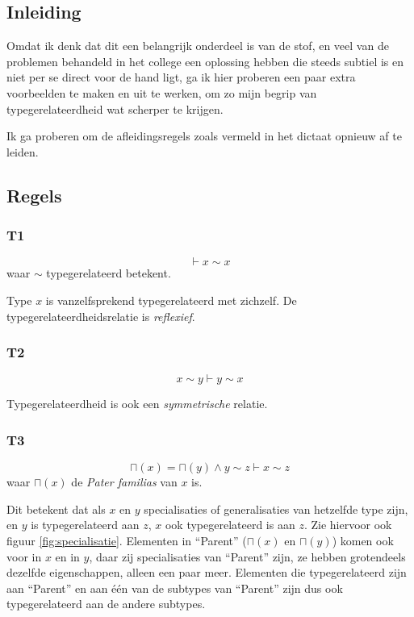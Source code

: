 \documentclass{article}
\begin{document}
\subsection{Inleiding}
Omdat ik denk dat dit een belangrijk onderdeel is van de stof, en veel van de
problemen behandeld in het college een oplossing hebben die steeds subtiel is 
en niet per se direct voor de hand ligt, ga ik hier proberen een paar extra
voorbeelden te maken en uit te werken, om zo mijn begrip van 
typegerelateerdheid wat scherper te krijgen.

Ik ga proberen om de afleidingsregels zoals vermeld in het dictaat 
\cite[p.~41]{dictaat} opnieuw af te leiden.

\subsection{Regels}
\subsubsection{T1}

\[ 
  \vdash x \sim x
\] waar $\sim$ typegerelateerd betekent.

Type $x$ is vanzelfsprekend typegerelateerd met zichzelf. De typegerelateerdheidsrelatie
is \emph{reflexief}.

\subsubsection{T2}
\[ 
  x \sim y \vdash y \sim x
\]

Typegerelateerdheid is ook een \emph{symmetrische} relatie.

\subsubsection{T3}
\label{s2e:t3}
\[
  \sqcap (x) = \sqcap (y) \wedge y \sim z \vdash x \sim z
\] waar $\sqcap (x)$ de \emph{Pater familias} van $x$ is.

Dit betekent dat als $x$ en $y$ specialisaties of generalisaties van hetzelfde
type zijn, en $y$ is typegerelateerd aan $z$, $x$ ook typegerelateerd is
aan $z$. Zie hiervoor ook figuur \ref{fig:specialisatie}. Elementen in
``Parent'' ($\sqcap(x)$ en $\sqcap(y)$) komen ook voor in $x$ en in $y$, daar
zij specialisaties van ``Parent'' zijn, ze hebben grotendeels dezelfde
eigenschappen, alleen een paar meer. Elementen die typegerelateerd zijn aan
``Parent'' en aan \'e\'en van de subtypes van ``Parent'' zijn dus ook
typegerelateerd aan de andere subtypes.
\end{document}
